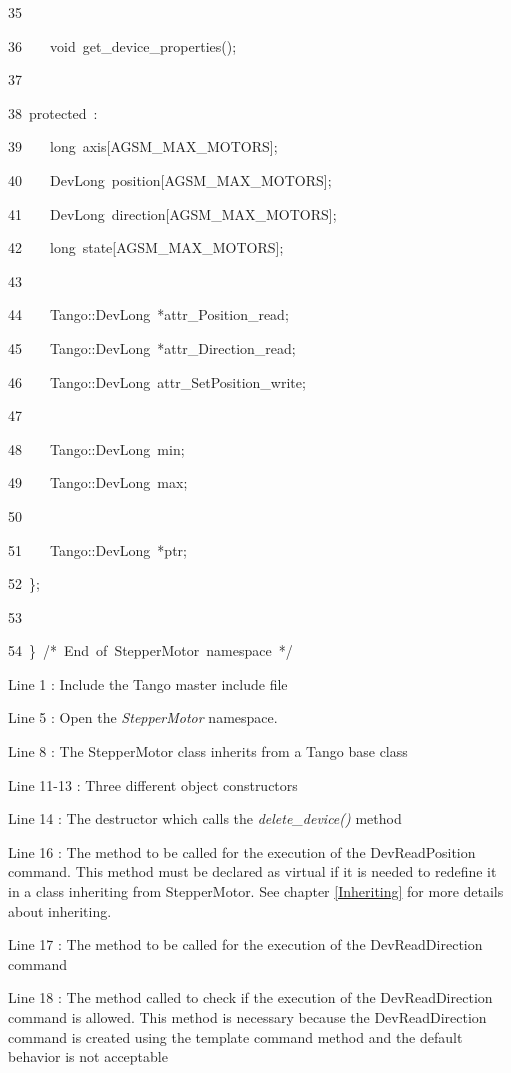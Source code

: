 \begin{lyxcode}
35~

36~~~~void~get\_device\_properties();

37~

38~protected~:~

39~~~~long~axis{[}AGSM\_MAX\_MOTORS{]};

40~~~~DevLong~position{[}AGSM\_MAX\_MOTORS{]};

41~~~~DevLong~direction{[}AGSM\_MAX\_MOTORS{]};

42~~~~long~state{[}AGSM\_MAX\_MOTORS{]};

43~

44~~~~Tango::DevLong~{*}attr\_Position\_read;

45~~~~Tango::DevLong~{*}attr\_Direction\_read;

46~~~~Tango::DevLong~attr\_SetPosition\_write;

47~

48~~~~Tango::DevLong~min;

49~~~~Tango::DevLong~max;

50~

51~~~~Tango::DevLong~{*}ptr;

52~\};

53~

54~\}~/{*}~End~of~StepperMotor~namespace~{*}/
\end{lyxcode}




Line 1 : Include the Tango master include file

Line 5 : Open the \emph{StepperMotor} namespace.

Line 8 : The StepperMotor class inherits from a Tango base class

Line 11-13 : Three different object constructors

Line 14 : The destructor which calls the \emph{delete\_device()} method

Line 16 : The method to be called for the execution of the DevReadPosition
command. This method must be declared as virtual if it is needed to
redefine it in a class inheriting from StepperMotor. See chapter \ref{Inheriting}
for more details about inheriting.

Line 17 : The method to be called for the execution of the DevReadDirection
command

Line 18 : The method called to check if the execution of the DevReadDirection
command is allowed. This method is necessary because the DevReadDirection
command is created using the template command method and the default
behavior is not acceptable


